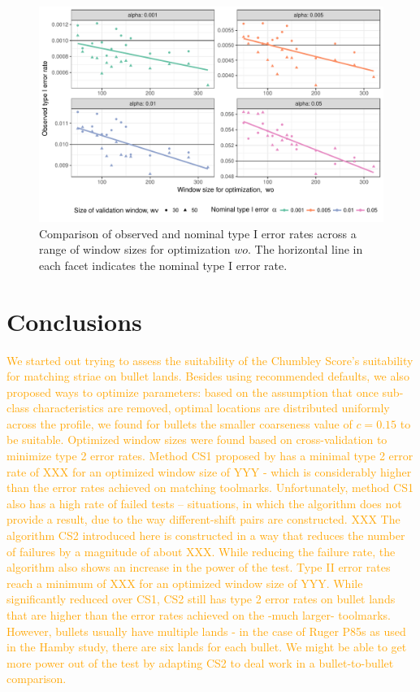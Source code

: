 \documentclass[12pt]{article}
\begin{document}
\begin{figure}

{\centering \includegraphics[width=\textwidth]{figures/type1-1} 

}

\caption{Comparison of observed and nominal type I error rates  across a range of window sizes for optimization $wo$. The horizontal line in each facet indicates the nominal type I error rate.}\label{fig:type1}
\end{figure}

\hypertarget{conclusions}{%
\section{Conclusions}\label{conclusions}}

{\textcolor{orange}{
We started out trying to assess the suitability of the Chumbley Score's suitability for matching striae on bullet lands. Besides using recommended defaults, we also proposed ways to optimize parameters: based on the assumption that once sub-class characteristics are removed, optimal locations are distributed uniformly across the profile, we found  for bullets the smaller coarseness value of $c = 0.15$ to be suitable. 
Optimized window sizes were found based on cross-validation to minimize type 2 error rates. 
Method CS1 proposed by \citet{hadler} has a minimal type 2 error rate of XXX for an optimized window size of YYY - which is considerably higher than the error rates achieved on matching toolmarks. 
Unfortunately, method CS1 also has a high rate of failed tests -- situations, in which the algorithm does not provide a result, due to the way different-shift pairs are constructed. 
XXX
The algorithm CS2 introduced here is constructed in a way that reduces the number of failures by a magnitude of about XXX. While reducing the failure rate, the algorithm also shows an increase in the power of the test. Type II error rates reach a minimum of XXX for an optimized window size of YYY. While significantly reduced over CS1, CS2 still has type 2 error rates on bullet lands that are  higher than the error rates achieved on the -much larger- toolmarks.
However, bullets usually have multiple lands - in the case of Ruger P85s as used in the Hamby study, there are six lands for each bullet. We might be able to get more power out of the test by adapting CS2 to deal work in a bullet-to-bullet comparison.
}}
\end{document}
